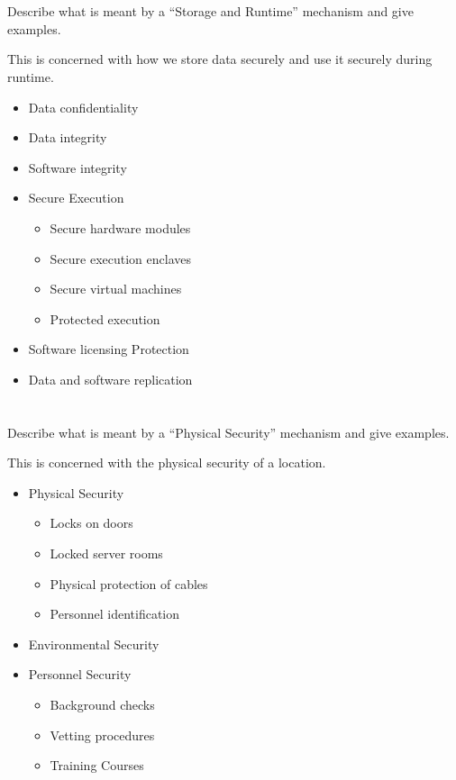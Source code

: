 \begin{questions}
\begin{parts}
  \part{} Describe what is meant by a ``Storage and Runtime'' mechanism and give examples.
    \begin{solution}
      This is concerned with how we store data securely and use it securely during runtime.
      \begin{itemize}[noitemsep]
      \item Data confidentiality
      \item Data integrity
      \item Software integrity
      \item Secure Execution
        \begin{itemize}[noitemsep]
        \item Secure hardware modules
        \item Secure execution enclaves
        \item Secure virtual machines
        \item Protected execution
        \end{itemize}
      \item Software licensing Protection
      \item Data and software replication
      \end{itemize}
    \end{solution}

  \part{} Describe what is meant by a ``Physical Security'' mechanism and give examples.
    \begin{solution}
      This is concerned with the physical security of a location.
      \begin{itemize}[noitemsep]
      \item Physical Security
        \begin{itemize}[noitemsep]
        \item Locks on doors
        \item Locked server rooms
        \item Physical protection of cables
        \item Personnel identification
        \end{itemize}
      \item Environmental Security
      \item Personnel Security
        \begin{itemize}[noitemsep]
        \item Background checks
        \item Vetting procedures
        \item Training Courses
        \end{itemize}
      \end{itemize}
    \end{solution}


\end{parts}
\end{questions}
